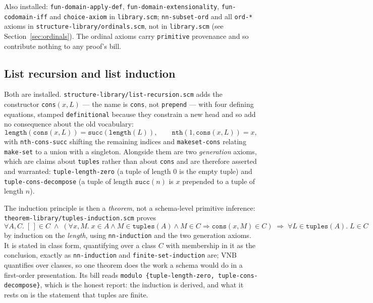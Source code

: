 Also installed:
\texttt{fun-domain-apply-def}, \texttt{fun-domain-extensionality},
\texttt{fun-codomain-iff} and \texttt{choice-axiom} in \texttt{library.scm};
\texttt{nn-subset-ord} and all \texttt{ord-*} axioms in
\texttt{structure-library/ordinals.scm}, not in \texttt{library.scm}
(see Section~\ref{sec:ordinals}).  The ordinal axioms carry
\texttt{primitive} provenance and so contribute nothing to any proof's bill.

\subsection*{List recursion and list induction}
\label{sec:list-recursion}

Both are installed.  \texttt{structure-library/list-recursion.scm} adds the
constructor \texttt{cons}$(x, L)$ --- the name is \texttt{cons}, not
\texttt{prepend} --- with four defining equations, stamped
\texttt{definitional} because they constrain a new head and so add no
consequence about the old vocabulary:
\[
  \texttt{length}(\texttt{cons}(x,L)) = \texttt{succ}(\texttt{length}(L)),
  \qquad
  \texttt{nth}(1, \texttt{cons}(x,L)) = x,
\]
with \texttt{nth-cons-succ} shifting the remaining indices and
\texttt{makeset-cons} relating \texttt{make-set} to a union with a singleton.
Alongside them are two \emph{generation} axioms, which are claims about
\texttt{tuples} rather than about \texttt{cons} and are therefore asserted and
warranted: \texttt{tuple-length-zero} (a tuple of length $0$ is the empty
tuple) and \texttt{tuple-cons-decompose} (a tuple of length $\texttt{succ}(n)$
is $x$ prepended to a tuple of length $n$).

The induction principle is then a \emph{theorem}, not a schema-level primitive
inference: \texttt{theorem-library/tuples-induction.scm} proves
\[
  \forall A, C.\;
  [\,]\in C \;\wedge\;
  (\forall x, M.\; x \in A \wedge M \in \mathtt{tuples}(A) \wedge M \in C
     \Rightarrow \texttt{cons}(x,M) \in C)
  \;\Rightarrow\;
  \forall L \in \mathtt{tuples}(A).\; L \in C
\]
by induction on the \emph{length}, using \texttt{nn-induction} and the two
generation axioms.  It is stated in class form, quantifying over a class $C$
with membership in it as the conclusion, exactly as \texttt{nn-induction} and
\texttt{finite-set-induction} are; VNB quantifies over classes, so one theorem
does the work a schema would do in a first-order presentation.  Its bill reads
\texttt{modulo \{tuple-length-zero, tuple-cons-decompose\}}, which is the honest
report: the induction is derived, and what it rests on is the statement that
tuples are finite.

